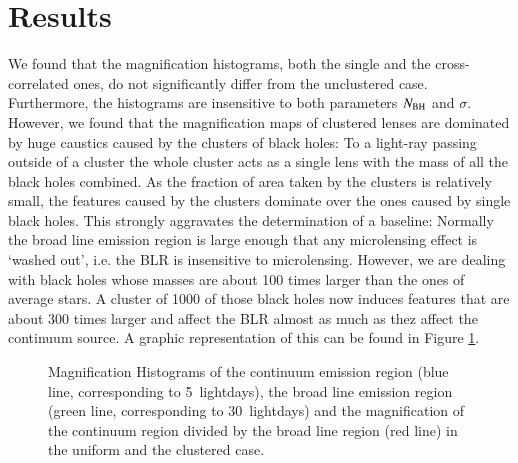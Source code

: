 \documentclass{aa}
\begin{document}
\section{Results}
We found that the magnification histograms, both the single and the cross-correlated ones, do not significantly differ from the unclustered case. Furthermore, the histograms are insensitive to both parameters $N_{\rm BH}$ and $\sigma$. However, we found that the magnification maps of clustered lenses are dominated by huge caustics caused by the clusters of black holes: To a light-ray passing outside of a cluster the whole cluster acts as a single lens with the mass of all the black holes combined. As the fraction of area taken by the clusters is relatively small, the features caused by the clusters dominate over the ones caused by single black holes. This strongly aggravates the determination of a baseline: Normally the broad line emission region is large enough that any microlensing effect is `washed out', i.e. the BLR is insensitive to microlensing. However, we are dealing with black holes whose masses are about \num{100} times larger than the ones of average stars. A cluster of \num{1000} of those black holes now induces features that are about \num{300} times larger and affect the BLR almost as much as thez affect the continuum source. A graphic representation of this can be found in Figure \ref{fig:relmag}.
\begin{figure}
	\centering
	\caption{Magnification Histograms of the continuum emission region (blue line, corresponding to \SI{5}{lightdays}), the broad line emission region (green line, corresponding to \SI{30}{lightdays}) and the magnification of the continuum region divided by the broad line region (red line) in the uniform and the clustered case.}
	\label{fig:relmag}
\end{figure}
\end{document}
